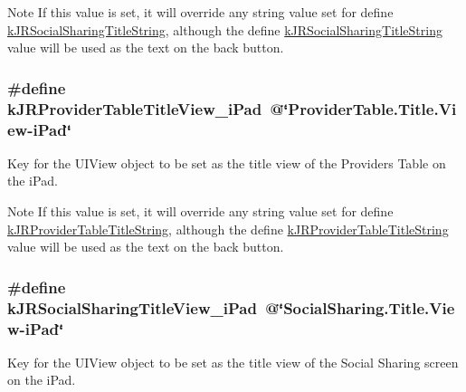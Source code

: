 \begin{DoxyNote}{Note}
If this value is set, it will override any string value set for define \hyperlink{group__custom_interface_ga8fb89469dc5225bf0ea4d1faca6aa2ab}{kJRSocialSharingTitleString}, although the define \hyperlink{group__custom_interface_ga8fb89469dc5225bf0ea4d1faca6aa2ab}{kJRSocialSharingTitleString} value will be used as the text on the back button. 
\end{DoxyNote}
\hypertarget{group__custom_interface_ga52c322e9fd2aa78cbd64d050f0fd5e41}{
\subsubsection[{kJRProviderTableTitleView\_\-iPad}]{\setlength{\rightskip}{0pt plus 5cm}\#define kJRProviderTableTitleView\_\-iPad~@\char`\"{}ProviderTable.Title.View-\/iPad\char`\"{}}}
\label{group__custom_interface_ga52c322e9fd2aa78cbd64d050f0fd5e41}
Key for the {\ttfamily UIView} object to be set as the title view of the Providers Table on the iPad.

\begin{DoxyNote}{Note}
If this value is set, it will override any string value set for define \hyperlink{group__custom_interface_gaf728e45125be9ca6fa515a39a77e7ce7}{kJRProviderTableTitleString}, although the define \hyperlink{group__custom_interface_gaf728e45125be9ca6fa515a39a77e7ce7}{kJRProviderTableTitleString} value will be used as the text on the back button. 
\end{DoxyNote}
\hypertarget{group__custom_interface_ga2f88062cdd1fd38ad0e800d382450398}{
\subsubsection[{kJRSocialSharingTitleView\_\-iPad}]{\setlength{\rightskip}{0pt plus 5cm}\#define kJRSocialSharingTitleView\_\-iPad~@\char`\"{}SocialSharing.Title.View-\/iPad\char`\"{}}}
\label{group__custom_interface_ga2f88062cdd1fd38ad0e800d382450398}
Key for the {\ttfamily UIView} object to be set as the title view of the Social Sharing screen on the iPad.

